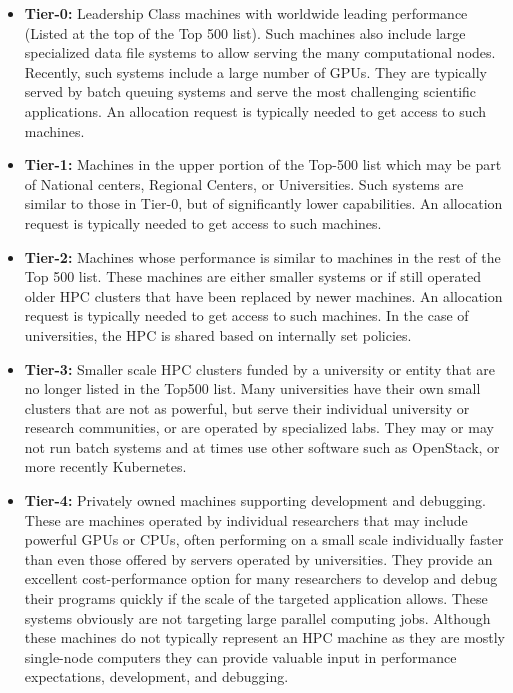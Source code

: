 \documentclass[sigconf]{acmart}
\begin{document}
\begin{itemize}
\item {\bf Tier-0:} Leadership Class machines with worldwide leading
  performance (Listed at the top of the Top 500 list). Such machines also include large specialized data file systems to allow serving the many computational nodes. Recently, such systems include a large number of GPUs. They are typically served by batch queuing systems and serve the most challenging scientific applications. An allocation request is typically needed to get access to such machines.
\item {\bf Tier-1:} Machines in the upper portion of the Top-500 list which may be part of National centers, Regional Centers, or Universities. Such systems are similar to those in Tier-0, but of significantly lower capabilities.
An allocation request is typically needed to get access to such machines.
\item {\bf Tier-2:} Machines whose performance is similar to machines
  in the rest of the Top 500 list. These machines are either smaller systems or if still operated older HPC clusters that have been replaced by newer machines.
  An allocation request is typically needed to get access to such machines. In the case of universities, the HPC is shared based on internally set policies.
\item {\bf Tier-3:} Smaller scale HPC clusters funded by a university or entity
  that are no longer listed in the Top500 list. Many universities have their own small clusters that are not as powerful, but serve their individual university or research communities, or are operated by specialized  labs. They may or may not run batch systems and at times use other software such as OpenStack, or more recently Kubernetes. 
\item {\bf Tier-4:} Privately owned machines supporting development
  and debugging. These are machines operated by individual researchers that may include powerful GPUs or CPUs, often performing on a small scale individually faster than even those offered by servers operated by universities. They provide an excellent cost-performance option for many researchers to develop and debug their programs quickly if the scale of the targeted application allows. These systems obviously are not targeting large parallel computing jobs. Although these machines do not typically represent an HPC machine as they are mostly single-node computers they can provide valuable input in performance expectations, development, and debugging.
\end{itemize}
\end{document}
